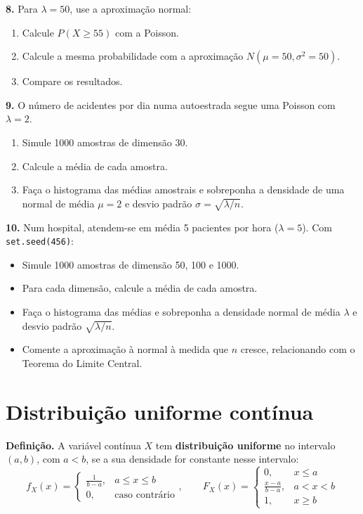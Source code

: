 \documentclass[
  portuguese,
  11pt,
  openany]{book}
\providecommand{\tightlist}{%
  \setlength{\itemsep}{0pt}\setlength{\parskip}{0pt}}
\begin{document}
\textbf{8.} Para \(\lambda = 50\), use a aproximação normal:

\begin{enumerate}
\def\labelenumi{(\alph{enumi})}
\tightlist
\item
  Calcule \(P(X \geq 55)\) com a Poisson.
\item
  Calcule a mesma probabilidade com a aproximação \(N(\mu = 50, \sigma^2 = 50)\).
\item
  Compare os resultados.
\end{enumerate}

\textbf{9.} O número de acidentes por dia numa autoestrada segue uma Poisson com \(\lambda = 2\).

\begin{enumerate}
\def\labelenumi{(\alph{enumi})}
\tightlist
\item
  Simule 1000 amostras de dimensão 30.
\item
  Calcule a média de cada amostra.
\item
  Faça o histograma das médias amostrais e sobreponha a densidade de uma normal de
  média \(\mu = 2\) e desvio padrão \(\sigma = \sqrt{\lambda / n}\).
\end{enumerate}

\textbf{10.} Num hospital, atendem-se em média 5 pacientes por hora (\(\lambda = 5\)). Com
\texttt{set.seed(456)}:

\begin{itemize}
\tightlist
\item
  Simule 1000 amostras de dimensão 50, 100 e 1000.
\item
  Para cada dimensão, calcule a média de cada amostra.
\item
  Faça o histograma das médias e sobreponha a densidade normal de média \(\lambda\) e
  desvio padrão \(\sqrt{\lambda / n}\).
\item
  Comente a aproximação à normal à medida que \(n\) cresce, relacionando com o Teorema do
  Limite Central.
\end{itemize}

\section{Distribuição uniforme contínua}\label{distribuiuxe7uxe3o-uniforme-contuxednua}

\textbf{Definição.} A variável contínua \(X\) tem \textbf{distribuição uniforme} no intervalo
\((a, b)\), com \(a < b\), se a sua densidade for constante nesse intervalo:
\[f_X(x) = \begin{cases} \frac{1}{b-a}, & a \leq x \leq b \\ 0, & \text{caso contrário} \end{cases}, \qquad
F_X(x) = \begin{cases} 0, & x \leq a \\ \frac{x-a}{b-a}, & a < x < b \\ 1, & x \geq b \end{cases}\]
\end{document}
